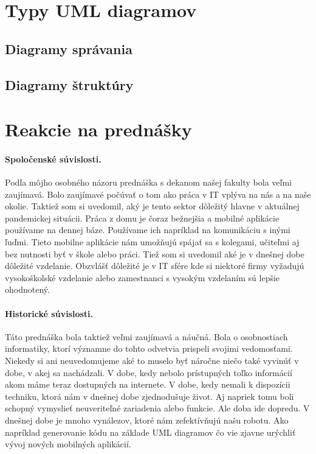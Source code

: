 \documentclass[10pt,twoside,slovak,a4paper]{article}
\begin{document}
\section{Typy UML diagramov} \label{Typy UML diagramov}
    \subsection{Diagramy správania}\label{Typy UML diagramov:Diagramy správania}
    
    \subsection{Diagramy štruktúry}\label{Typy UML diagramov:Diagramy štruktúry}
    
\section{Reakcie na prednášky} \label{Reakcie na prednášky}

 \paragraph{Spoločenské súvislosti.}Podľa môjho osobného názoru prednáška s dekanom našej fakulty bola veľmi zaujímavá. Bolo zaujímavé počúvať o tom ako práca v IT vplýva na nás a na naše okolie. \newline
Taktiež som si uvedomil, aký je tento sektor dôležitý hlavne v aktuálnej pandemickej situácii. Práca z domu je čoraz bežnejšia a mobilné aplikácie používame na dennej báze. Používame ich napríklad na komunikáciu s inými ľuďmi. Tieto mobilne aplikácie nám umožňujú spájať sa s kolegami, učiteľmi aj bez nutnosti byť v škole alebo práci.\newline
Tiež som si uvedomil aké je v dnešnej dobe dôležité vzdelanie. Obzvlášť dôležité je v IT sfére kde si niektoré firmy vyžadujú vysokoškolské vzdelanie alebo zamestnanci s vysokým vzdelaním sú lepšie ohodnotený.

 
 \paragraph{Historické súvislosti.}Táto prednáška bola taktiež veľmi zaujímavá a náučná. Bola o osobnostiach informatiky, ktorí významne do tohto odvetvia prispeli svojimi vedomosťami. Niekedy si ani neuvedomujeme aké to muselo byť náročne niečo také vyvinúť v dobe, v akej sa nachádzali. V dobe, kedy nebolo prístupných toľko informácií akom máme teraz dostupných na internete. V dobe, kedy nemali k dispozícii techniku, ktorá nám v dnešnej dobe zjednodušuje život. Aj napriek tomu boli schopný vymyslieť neuveriteľné zariadenia alebo funkcie. \newline
 Ale doba ide dopredu. V dnešnej dobe je mnoho vynálezov, ktoré nám zefektívňujú našu robotu. Ako napríklad generovanie kódu na základe UML diagramov čo vie zjavne urýchliť vývoj nových mobilných aplikácií.
 
\end{document}
